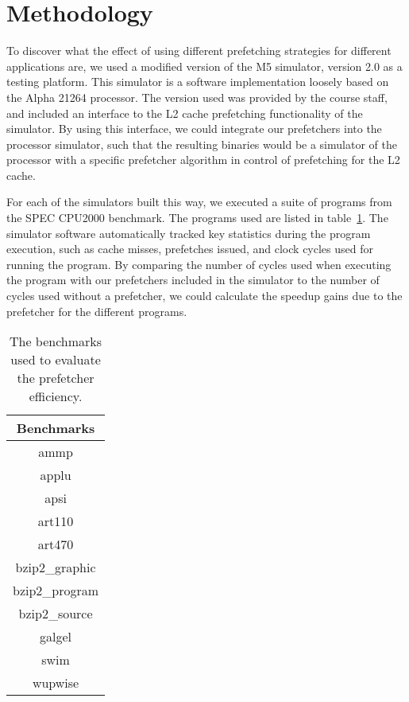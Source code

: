 
\section{Methodology}
\label{sec:methodology}

To discover what the effect of using different prefetching strategies
for different applications are, we used a modified version of the M5
simulator, version 2.0\cite{M5} as a testing platform. This simulator
is a software implementation loosely based on the Alpha 21264
processor\cite{Alpha}. The version used was provided by the course
staff, and included an interface to the L2 cache prefetching
functionality of the simulator. By using this interface, we could
integrate our prefetchers into the processor simulator, such that the
resulting binaries would be a simulator of the processor with a
specific prefetcher algorithm in control of prefetching for the L2 cache.

For each of the simulators built this way, we executed a suite of
programs from the SPEC CPU2000 benchmark. The programs used are listed
in table~\ref{tab:benchmarks}. The simulator software automatically
tracked key statistics during the program execution, such as cache
misses, prefetches issued, and clock cycles used for running the
program. By comparing the number of cycles used when executing the
program with our prefetchers included in the simulator to the number
of cycles used without a prefetcher, we could calculate the speedup
gains due to the prefetcher for the different programs.

\begin{table}[htbp]
  \centering
  \begin{tabular}{|c|}
    \hline
    {\bf Benchmarks} \\ \hline
    ammp \\ \hline
    applu \\ \hline
    apsi \\ \hline
    art110 \\ \hline
    art470 \\ \hline
    bzip2\_graphic \\ \hline
    bzip2\_program \\ \hline
    bzip2\_source \\ \hline
    galgel \\ \hline
    swim \\ \hline
    wupwise \\ \hline
  \end{tabular}
  \caption{The benchmarks used to evaluate the prefetcher efficiency.}
  \label{tab:benchmarks}
\end{table}

